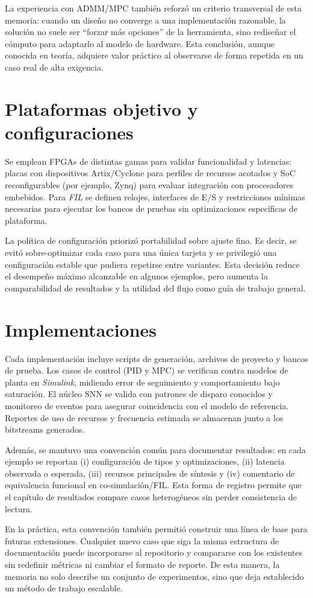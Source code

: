 La experiencia con ADMM/MPC también reforzó un criterio transversal de esta memoria: cuando un diseño no converge a una implementación razonable, la solución no suele ser ``forzar más opciones'' de la herramienta, sino rediseñar el cómputo para adaptarlo al modelo de hardware. Esta conclusión, aunque conocida en teoría, adquiere valor práctico al observarse de forma repetida en un caso real de alta exigencia.

\section{Plataformas objetivo y configuraciones}

Se emplean FPGAs de distintas gamas para validar funcionalidad y latencias: placas con dispositivos Artix/Cyclone para perfiles de recursos acotados y SoC reconfigurables (por ejemplo, Zynq) para evaluar integración con procesadores embebidos. Para \textit{FIL} se definen relojes, interfaces de E/S y restricciones mínimas necesarias para ejecutar los bancos de pruebas sin optimizaciones específicas de plataforma.

La política de configuración priorizó portabilidad sobre ajuste fino. Es decir, se evitó sobre-optimizar cada caso para una única tarjeta y se privilegió una configuración estable que pudiera repetirse entre variantes. Esta decisión reduce el desempeño máximo alcanzable en algunos ejemplos, pero aumenta la comparabilidad de resultados y la utilidad del flujo como guía de trabajo general.

\section{Implementaciones}

Cada implementación incluye scripts de generación, archivos de proyecto y bancos de prueba. Los casos de control (PID y MPC) se verifican contra modelos de planta en \textit{Simulink}, midiendo error de seguimiento y comportamiento bajo saturación. El núcleo SNN se valida con patrones de disparo conocidos y monitoreo de eventos para asegurar coincidencia con el modelo de referencia. Reportes de uso de recursos y frecuencia estimada se almacenan junto a los bitstreams generados.

Además, se mantuvo una convención común para documentar resultados: en cada ejemplo se reportan (i) configuración de tipos y optimizaciones, (ii) latencia observada o esperada, (iii) recursos principales de síntesis y (iv) comentario de equivalencia funcional en co-simulación/FIL. Esta forma de registro permite que el capítulo de resultados compare casos heterogéneos sin perder consistencia de lectura.

En la práctica, esta convención también permitió construir una línea de base para futuras extensiones. Cualquier nuevo caso que siga la misma estructura de documentación puede incorporarse al repositorio y compararse con los existentes sin redefinir métricas ni cambiar el formato de reporte. De esta manera, la memoria no solo describe un conjunto de experimentos, sino que deja establecido un método de trabajo escalable.
